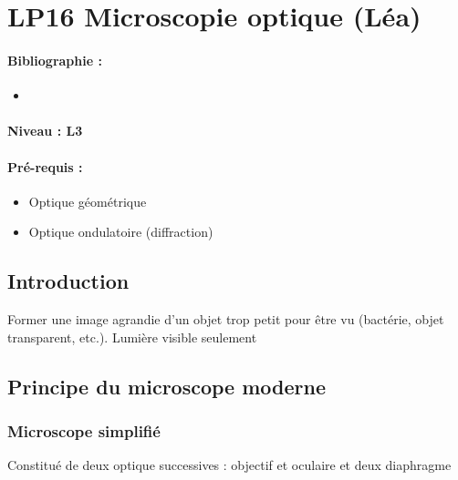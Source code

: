 \section{LP16 Microscopie optique (Léa)}

\paragraph{Bibliographie :}
\begin{itemize}
\item 
\end{itemize}

\paragraph{Niveau : L3} 

\paragraph{Pré-requis :}
\begin{itemize}
\item Optique géométrique
\item Optique ondulatoire (diffraction)
\end{itemize}

\subsection{Introduction}

Former une image agrandie d'un objet trop petit pour être vu (bactérie, objet transparent, etc.). 
Lumière visible seulement

\subsection{Principe du microscope moderne}

\subsubsection{Microscope simplifié}

Constitué de deux optique successives : objectif et oculaire et deux diaphragme

